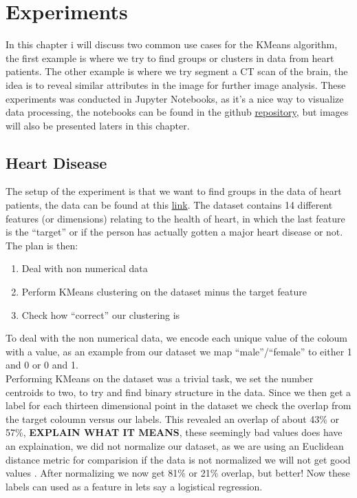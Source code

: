 \documentclass[12pt]{report}
\begin{document}






\chapter{Experiments}
\label{sec:experi}
In this chapter i will discuss two common use cases for the KMeans algorithm, the first example is where we try to find groups or clusters in data from heart patients. The other example is where we try segment a CT scan of the brain, the idea is to reveal similar attributes in the image for further image analysis. These experiments was conducted in Jupyter Notebooks, as it's a nice way to visualize data processing, the notebooks can be found in the github \href{https://github.com/shadesfear/bachelor}{repository}, but images will also be presented laters in this chapter.
\section{Heart Disease}
\label{sec:heart}
The setup of the experiment is that we want to find groups in the data of heart patients, the data can be found at this \href{https://www.kaggle.com/ronitf/heart-disease-uci}{link}. The dataset contains 14 different features (or dimensions) relating to the health of heart, in which the last feature is the ``target'' or if the person has actually gotten a major heart disease or not. The plan is then:
\begin{enumerate}
\item Deal with non numerical data
\item Perform KMeans clustering on the dataset minus the target feature
\item Check how ``correct'' our clustering is
\end{enumerate}
To deal with the non numerical data, we encode each unique value of the coloum with a value, as an example from our dataset we map ``male''/``female'' to either 1 and 0 or 0 and 1.\\
Performing KMeans on the dataset was a trivial task, we set the number centroids to two, to try and find binary structure in the data. Since we then get a label for each thirteen dimensional point in the dataset we check the overlap from the target coloumn versus our labels. This revealed an overlap of about 43\% or 57\%, \textbf{EXPLAIN WHAT IT MEANS}, these seemingly bad values does have an explaination, we did not normalize our dataset, as we are using an Euclidean distance metric for comparision if the data is not normalized we will not get good values \cite{kmeansconvergence}. After normalizing we now get 81\% or 21\% overlap, but better! Now these labels can used as a feature in lets say a logistical regression.
\end{document}
